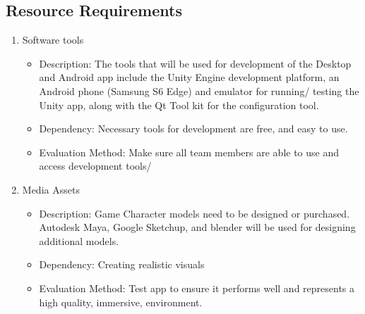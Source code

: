 \documentclass[a4paper,10pt]{article}
\begin{document}
	\subsection{Resource Requirements}
	\begin{enumerate}
	\item Software tools
	\begin{itemize}
	\item Description: The tools that will be used for development of the Desktop and Android app  include the Unity Engine development platform, an Android phone (Samsung S6 Edge) and emulator for running/ testing the Unity app,
	  along with the Qt Tool kit for the configuration tool.
	\item  Dependency: Necessary tools for development are free, and easy to use. 
	\item Evaluation Method: Make sure all team members are able to use and access development tools/
	  \end{itemize}
	\item Media Assets
	\begin{itemize}
	  \item Description: Game Character models need to be designed or purchased. Autodesk Maya, Google Sketchup, and blender will be used for designing additional models. 
	  \item Dependency: Creating realistic visuals 
	  \item Evaluation Method: Test app to ensure it performs well and represents a high quality, immersive, environment.
	\end{itemize}
	\end{enumerate}
\end{document}
